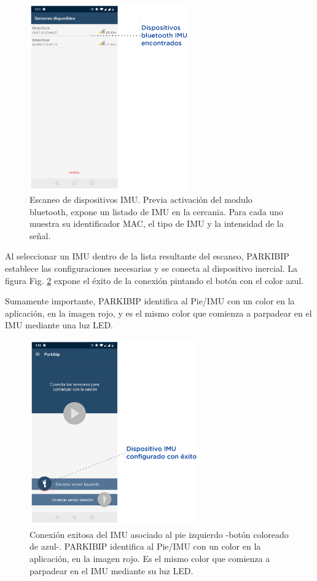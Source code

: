 \begin{figure}[H]
 \centering
 \includegraphics[height=8cm]{TESIS/imagenes/user-manual/manual-search.PNG}
 \caption{Escaneo de dispositivos IMU. Previa activación del modulo bluetooth, expone un listado de IMU en la cercania. Para cada uno muestra su identificador MAC, el tipo de IMU y la intensidad de la señal.}
 \label{fig:manual-search}
\end{figure}

Al seleccionar un IMU dentro de la lista resultante del escaneo, PARKIBIP establece las configuraciones necesarias y se conecta al dispositivo inercial. La figura Fig. \ref{fig:manual-imu-config} expone el éxito de la conexión pintando el botón con el color azul. 

Sumamente importante, PARKIBIP identifica al Pie/IMU con un color en la aplicación, en la imagen rojo, y es el mismo color que comienza a parpadear en el IMU mediante una luz LED.

\newpage

\begin{figure}[H]
 \centering
 \includegraphics[height=8cm]{TESIS/imagenes/user-manual/manual-imu-config.PNG}
 \caption{Conexión exitosa del IMU asociado al pie izquierdo -botón coloreado de azul-. PARKIBIP identifica al Pie/IMU con un color en la aplicación, en la imagen rojo. Es el mismo color que comienza a parpadear en el IMU mediante su luz LED.}
 \label{fig:manual-imu-config}
\end{figure}

